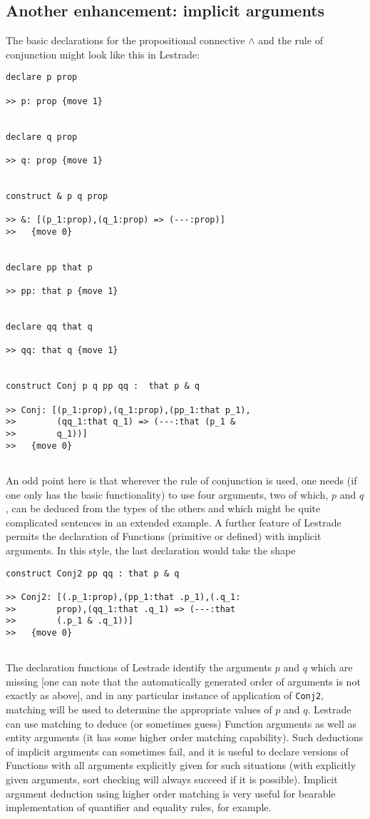 \documentclass{article}
\begin{document}
\subsection{Another enhancement:  implicit arguments}

The basic declarations for the propositional connective $\wedge$ and the rule of conjunction might look like this in Lestrade:

\begin{verbatim}
declare p prop

>> p: prop {move 1}


declare q prop

>> q: prop {move 1}


construct & p q prop

>> &: [(p_1:prop),(q_1:prop) => (---:prop)]
>>   {move 0}


declare pp that p

>> pp: that p {move 1}


declare qq that q

>> qq: that q {move 1}


construct Conj p q pp qq :  that p & q

>> Conj: [(p_1:prop),(q_1:prop),(pp_1:that p_1),
>>        (qq_1:that q_1) => (---:that (p_1 & 
>>        q_1))]
>>   {move 0}


\end{verbatim}

An odd point here is that wherever the rule of conjunction is used, one needs (if one only has the basic functionality) to use four arguments, two of which,
$p$ and $q$, can be deduced from the types of the others and which might be quite complicated sentences in an extended example.  A further feature of Lestrade permits the declaration of Functions (primitive or defined) with implicit arguments.  In this style, the last declaration would take the shape

\begin{verbatim}
construct Conj2 pp qq : that p & q

>> Conj2: [(.p_1:prop),(pp_1:that .p_1),(.q_1:
>>        prop),(qq_1:that .q_1) => (---:that 
>>        (.p_1 & .q_1))]
>>   {move 0}


\end{verbatim}

The declaration functions of Lestrade identify the arguments $p$ and $q$ which are missing [one can note that the automatically generated order of arguments is not exactly as above], and in any particular instance of application of {\tt Conj2}, matching will be used to determine the appropriate values of $p$ and $q$.  Lestrade can use matching to deduce (or sometimes guess) Function arguments as well as entity arguments (it has some higher order matching capability).  Such deductions of implicit arguments can sometimes fail, and it is useful to declare versions of
Functions with all arguments explicitly given for such situations (with explicitly given arguments, sort checking will always succeed if it is possible).  Implicit argument deduction using higher order matching is very useful for bearable implementation of quantifier and equality rules, for example.
\end{document}
